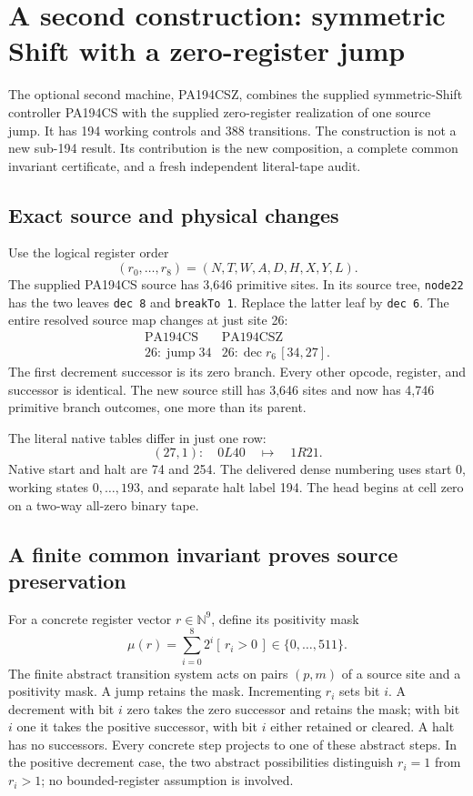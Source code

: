 \section{A second construction: symmetric Shift with a zero-register jump}
\label{sec:csz}

The optional second machine, PA194CSZ, combines the supplied symmetric-Shift
controller PA194CS with the supplied zero-register realization of one source
jump. It has 194 working controls and 388 transitions. The construction is
not a new sub-194 result. Its contribution is the new composition, a complete
common invariant certificate, and a fresh independent literal-tape audit.

\subsection{Exact source and physical changes}

Use the logical register order
\[
 (r_0,\ldots,r_8)=(N,T,W,A,D,H,X,Y,L).
\]
The supplied PA194CS source has 3,646 primitive sites. In its source tree,
\texttt{node22} has the two leaves
\texttt{dec 8} and \texttt{breakTo 1}. Replace the latter leaf by
\texttt{dec 6}. The entire resolved source map changes at just site 26:
\[
 \begin{array}{c|c}
 \text{PA194CS} & \text{PA194CSZ}\\\hline
 26:\operatorname{jump}34&
 26:\operatorname{dec}r_6\,[34,27].
 \end{array}
\]
The first decrement successor is its zero branch. Every other opcode,
register, and successor is identical. The new source still has 3,646 sites
and now has 4,746 primitive branch outcomes, one more than its parent.

The literal native tables differ in just one row:
\[
 (27,1):\quad 0L40\quad\longmapsto\quad1R21.
\]
Native start and halt are 74 and 254. The delivered dense numbering uses
start 0, working states $0,\ldots,193$, and separate halt label 194.
The head begins at cell zero on a two-way all-zero binary tape.

\subsection{A finite common invariant proves source preservation}

For a concrete register vector $r\in\mathbb N^9$, define its positivity mask
\[
 \mu(r)=\sum_{i=0}^{8}2^i[\,r_i>0\,]\in\{0,\ldots,511\}.
\]
The finite abstract transition system acts on pairs $(p,m)$ of a source
site and a positivity mask. A jump retains the mask. Incrementing $r_i$
sets bit $i$. A decrement with bit $i$ zero takes the zero successor and
retains the mask; with bit $i$ one it takes the positive successor, with
bit $i$ either retained or cleared. A halt has no successors. Every concrete
step projects to one of these abstract steps. In the positive decrement
case, the two abstract possibilities distinguish $r_i=1$ from $r_i>1$;
no bounded-register assumption is involved.

